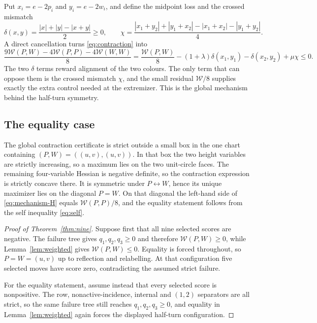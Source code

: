 \documentclass[11pt]{article}
\theoremstyle{plain}
\theoremstyle{definition}
\theoremstyle{remark}
\newcommand{\W}{\mathcal W}
\begin{document}
Put $x_i=e-2p_i$ and $y_i=e-2w_i$, and define the midpoint loss and the
crossed mismatch
\[
 \delta(x,y)=\frac{|x|+|y|-|x+y|}{2}\ge0,\qquad
 \chi=\frac{|x_1+y_2|+|y_1+x_2|-|x_1+x_2|-|y_1+y_2|}{4}.
\]
A direct cancellation turns \eqref{eq:contraction} into
\begin{equation}\label{eq:mechanism-H}
 \frac{9\W(P,W)-4\W(P,P)-4\W(W,W)}{8}
 =\frac{\W(P,W)}{8}-(1+\lambda)\delta(x_1,y_1)-\delta(x_2,y_2)+\mu\chi\le0 .
\end{equation}
The two $\delta$ terms reward alignment of the two colours.  The only term
that can oppose them is the crossed mismatch $\chi$, and the small residual
$\W/8$ supplies exactly the extra control needed at the extremizer.  This
is the global mechanism behind the half-turn symmetry.

\subsection{The equality case}

The global contraction certificate is strict outside a small box in the one
chart containing $(P,W)=((u,v),(u,v))$.  In that box the two height
variables are strictly increasing, so a maximum lies on the two
unit-circle faces.  The remaining four-variable Hessian is negative
definite, so the contraction expression is strictly concave there.  It is
symmetric under $P\leftrightarrow W$, hence its unique maximizer lies on
the diagonal $P=W$.  On that diagonal the left-hand side of
\eqref{eq:mechanism-H} equals $\W(P,P)/8$, and the equality statement
follows from the self inequality \eqref{eq:self}.

\begin{proof}[Proof of Theorem~\ref{thm:nine}]
Suppose first that all nine selected scores are negative.  The failure tree
gives $q_1,q_2,q_3\ge0$ and therefore $\W(P,W)\ge0$, while
Lemma~\ref{lem:weighted} gives $\W(P,W)\le0$.  Equality is forced
throughout, so $P=W=(u,v)$ up to reflection and relabelling.  At that
configuration five selected moves have score zero, contradicting the
assumed strict failure.

For the equality statement, assume instead that every selected score is
nonpositive.  The row, nonactive-incidence, internal and $(1,2)$
separators are all strict, so the same failure tree still reaches
$q_1,q_2,q_3\ge0$, and equality in Lemma~\ref{lem:weighted} again forces
the displayed half-turn configuration.
\end{proof}
\end{document}
